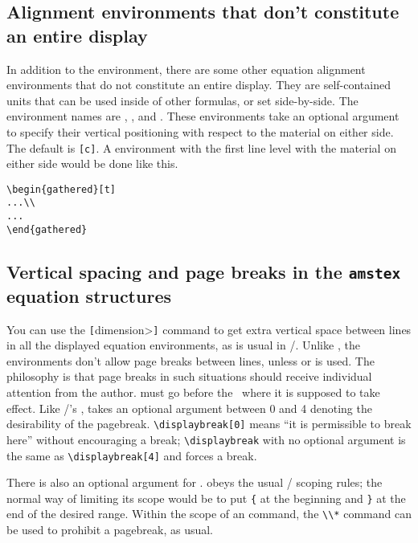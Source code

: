 \subsection{Alignment environments that don't constitute an entire display}
In addition to the  environment, there are some other
equation alignment environments that do not constitute an entire
display.  They are self-contained units that
can be used inside of other formulas, or set side-by-side.  The
environment names are , , and
.  These environments take an optional argument
to specify their vertical positioning with respect to the material
on either side.  The default is {\tt[c]}.  A 
environment with the first line level with the material on either
side would be done like this.
\begin{verbatim}
\begin{gathered}[t]
...\\
...
\end{gathered}
\end{verbatim}


\subsection{Vertical spacing and page breaks  in the {\tt amstex}
equation structures} You can use the
\cs\bslash\verb"["\<dimension>\verb"]" command to get extra vertical
space between lines in all the  displayed equation
environments, as is usual in \latex/\@.  Unlike ,  the
 environments don't allow page breaks between lines, unless
 or  is used.  The
philosophy is that page breaks in such situations should receive
individual attention from the author.   must go
before the \cs\bslash\ where it is supposed to take effect.  Like
\latex/'s ,  takes an optional argument
between 0 and 4 denoting the desirability of the pagebreak.
\verb"\displaybreak[0]" means ``it is permissible to break here''
without encouraging a break; \verb"\displaybreak" with no optional
argument is the same as \verb"\displaybreak[4]" and forces a break.

There is also an optional argument for .
 obeys the usual \latex/ scoping rules; the
normal way of limiting its scope would be to put
\verb"{" at the beginning and \verb"}" at the end
of the desired range.  Within the scope of an 
command, the \verb"\\*" command can be used to prohibit a pagebreak, as
usual.

